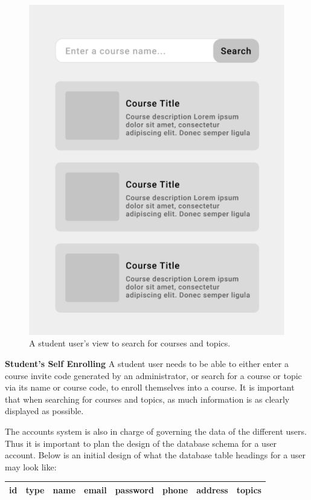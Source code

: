 \begin{figure}[h!]
  \centering
  \includegraphics[scale=0.2]{images/accounts-search}
  \caption{A student user's view to search for courses and topics.}
\end{figure}

\textbf{Student's Self Enrolling}
A student user needs to be able to either enter a course invite code generated by an administrator, or search for a course or topic via its name or course code, to enroll themselves into a course. It is important that when searching for courses and topics, as much information is as clearly displayed as possible.

The accounts system is also in charge of governing the data of the different users. Thus it is important to plan the design of the database schema for a user account. Below is an initial design of what the database table headings for a user may look like:

\begin{center}
    \begin{tabular}{|c|c|c|c|c|c|c|c|} 
        \hline
        id & type & name & email & password & phone & address & topics \\ [0.5ex] 
        \hline
    \end{tabular}
\end{center}

